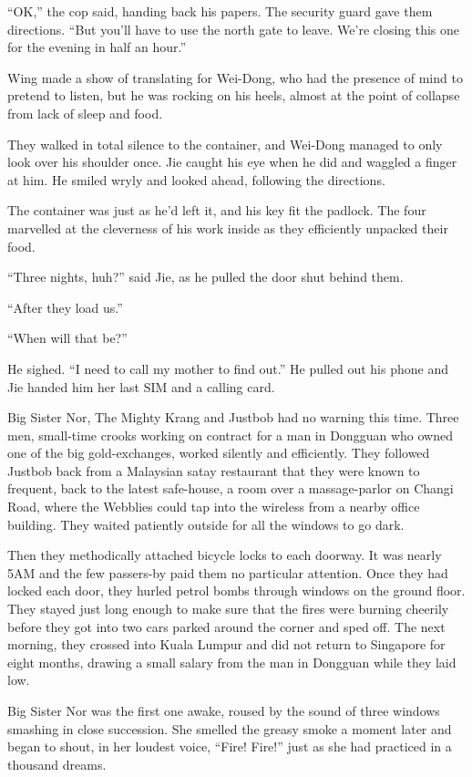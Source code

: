 ``OK,'' the cop said, handing back his papers. The security guard
gave them directions. ``But you'll have to use the north gate to
leave. We're closing this one for the evening in half an hour.''

Wing made a show of translating for Wei-Dong, who had the presence
of mind to pretend to listen, but he was rocking on his heels,
almost at the point of collapse from lack of sleep and food.

They walked in total silence to the container, and Wei-Dong managed
to only look over his shoulder once. Jie caught his eye when he did
and waggled a finger at him. He smiled wryly and looked ahead,
following the directions.

The container was just as he'd left it, and his key fit the
padlock. The four marvelled at the cleverness of his work inside as
they efficiently unpacked their food.

``Three nights, huh?'' said Jie, as he pulled the door shut behind
them.

``After they load us.''

``When will that be?''

He sighed. ``I need to call my mother to find out.'' He pulled out
his phone and Jie handed him her last SIM and a calling card.

\tb

Big Sister Nor, The Mighty Krang and Justbob had no warning this
time. Three men, small-time crooks working on contract for a man in
Dongguan who owned one of the big gold-exchanges, worked silently
and efficiently. They followed Justbob back from a Malaysian satay
restaurant that they were known to frequent, back to the latest
safe-house, a room over a massage-parlor on Changi Road, where the
Webblies could tap into the wireless from a nearby office building.
They waited patiently outside for all the windows to go dark.

Then they methodically attached bicycle locks to each doorway. It
was nearly 5AM and the few passers-by paid them no particular
attention. Once they had locked each door, they hurled petrol bombs
through windows on the ground floor. They stayed just long enough
to make sure that the fires were burning cheerily before they got
into two cars parked around the corner and sped off. The next
morning, they crossed into Kuala Lumpur and did not return to
Singapore for eight months, drawing a small salary from the man in
Dongguan while they laid low.

Big Sister Nor was the first one awake, roused by the sound of
three windows smashing in close succession. She smelled the greasy
smoke a moment later and began to shout, in her loudest voice,
``Fire! Fire!'' just as she had practiced in a thousand dreams.

